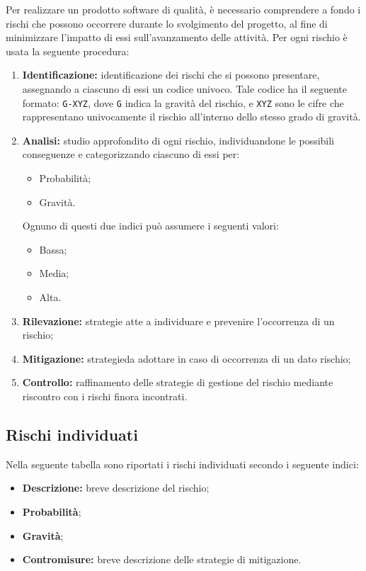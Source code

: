Per realizzare un prodotto software di {qualità}, è necessario
comprendere a fondo i rischi che possono occorrere durante lo svolgimento
del progetto, al fine di minimizzare l'impatto di essi sull'avanzamento
delle {attività}. \newline
Per ogni rischio è usata la seguente procedura:
\begin{enumerate}
    \item \textbf{Identificazione:}
           identificazione dei rischi che si possono presentare, assegnando a ciascuno di essi un codice univoco. Tale codice ha il seguente formato: \texttt{G-XYZ}, dove \texttt{G} indica la gravità del rischio, e \texttt{XYZ} sono le cifre che rappresentano univocamente il rischio all'interno dello stesso grado di gravità.
    \item \textbf{Analisi:} studio approfondito di ogni rischio, individuandone le possibili conseguenze e categorizzando ciascuno di essi per:
           \begin{itemize}
               \item Probabilità;
               \item Gravità.
           \end{itemize}
           Ognuno di questi due indici può assumere i seguenti valori:
           \begin{itemize}
               \item Bassa;
               \item Media;
               \item Alta.
           \end{itemize}
    \item \textbf{Rilevazione: }strategie atte a individuare e prevenire l'occorrenza di un rischio;
    \item \textbf{Mitigazione: }{strategie}\space da adottare in caso di occorrenza di un dato rischio;
    \item \textbf{Controllo:} raffinamento delle strategie di gestione del rischio mediante riscontro con i rischi
                              finora incontrati.
\end{enumerate}             
\subsection{Rischi individuati}            
Nella seguente tabella sono riportati i rischi individuati secondo i seguente indici:
\begin{itemize}
	\item \textbf{Descrizione: }breve descrizione del rischio; 
	\item \textbf{Probabilità};
    \item \textbf{Gravità};
    \item \textbf{Contromisure: }breve descrizione delle strategie di mitigazione.

\end{itemize}

